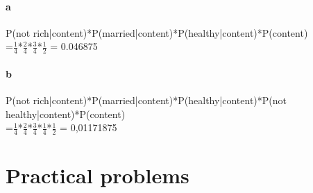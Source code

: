 \documentclass[a4paper,11pt]{article}
\begin{document}
\paragraph{a}
\noindent P(not rich|content)*P(married|content)*P(healthy|content)*P(content) \\
=$\frac{1}{4}$*$\frac{2}{4}$*$\frac{3}{4}$*$\frac{1}{2}$ = 0.046875\\

\paragraph{b}

\noindent P(not rich|content)*P(married|content)*P(healthy|content)*P(not healthy|content)*P(content) \\
=$\frac{1}{4}$*$\frac{2}{4}$*$\frac{3}{4}$*$\frac{1}{4}$*$\frac{1}{2}$ = 0,01171875\\




\subsection{}
\section{Practical problems}
\subsection{}

\subsection{}
\end{document}
